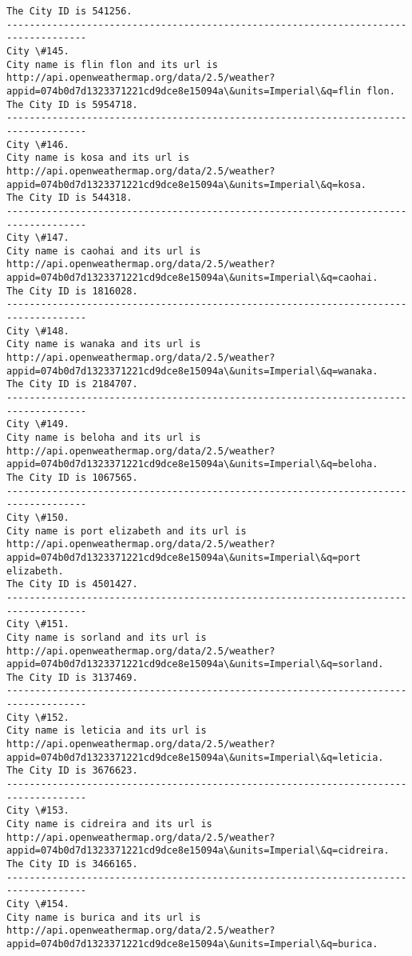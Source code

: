 \documentclass[11pt]{article}
\begin{document}
\begin{Verbatim}[commandchars=\\\{\}]
The City ID is 541256.
------------------------------------------------------------------------------------
City \#145.
City name is flin flon and its url is http://api.openweathermap.org/data/2.5/weather?appid=074b0d7d1323371221cd9dce8e15094a\&units=Imperial\&q=flin flon.
The City ID is 5954718.
------------------------------------------------------------------------------------
City \#146.
City name is kosa and its url is http://api.openweathermap.org/data/2.5/weather?appid=074b0d7d1323371221cd9dce8e15094a\&units=Imperial\&q=kosa.
The City ID is 544318.
------------------------------------------------------------------------------------
City \#147.
City name is caohai and its url is http://api.openweathermap.org/data/2.5/weather?appid=074b0d7d1323371221cd9dce8e15094a\&units=Imperial\&q=caohai.
The City ID is 1816028.
------------------------------------------------------------------------------------
City \#148.
City name is wanaka and its url is http://api.openweathermap.org/data/2.5/weather?appid=074b0d7d1323371221cd9dce8e15094a\&units=Imperial\&q=wanaka.
The City ID is 2184707.
------------------------------------------------------------------------------------
City \#149.
City name is beloha and its url is http://api.openweathermap.org/data/2.5/weather?appid=074b0d7d1323371221cd9dce8e15094a\&units=Imperial\&q=beloha.
The City ID is 1067565.
------------------------------------------------------------------------------------
City \#150.
City name is port elizabeth and its url is http://api.openweathermap.org/data/2.5/weather?appid=074b0d7d1323371221cd9dce8e15094a\&units=Imperial\&q=port elizabeth.
The City ID is 4501427.
------------------------------------------------------------------------------------
City \#151.
City name is sorland and its url is http://api.openweathermap.org/data/2.5/weather?appid=074b0d7d1323371221cd9dce8e15094a\&units=Imperial\&q=sorland.
The City ID is 3137469.
------------------------------------------------------------------------------------
City \#152.
City name is leticia and its url is http://api.openweathermap.org/data/2.5/weather?appid=074b0d7d1323371221cd9dce8e15094a\&units=Imperial\&q=leticia.
The City ID is 3676623.
------------------------------------------------------------------------------------
City \#153.
City name is cidreira and its url is http://api.openweathermap.org/data/2.5/weather?appid=074b0d7d1323371221cd9dce8e15094a\&units=Imperial\&q=cidreira.
The City ID is 3466165.
------------------------------------------------------------------------------------
City \#154.
City name is burica and its url is http://api.openweathermap.org/data/2.5/weather?appid=074b0d7d1323371221cd9dce8e15094a\&units=Imperial\&q=burica.

\end{Verbatim}
\end{document}
